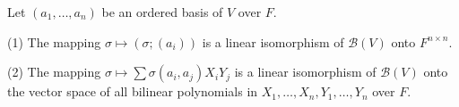 Let $(a_1, \ldots, a_n)$ be an ordered basis of $V$ over $F$.

(1) The mapping $\sigma \mapsto (\sigma; (a_i))$ is a linear isomorphism of $\mathcal{B}(V)$ onto $F^{n \times n}$.

(2) The mapping $\sigma \mapsto \sum \sigma(a_i, a_j) X_i Y_j$ is a linear isomorphism of $\mathcal{B}(V)$ onto the vector space of all bilinear polynomials in $X_1, \ldots, X_n, Y_1, \ldots, Y_n$ over $F$.
